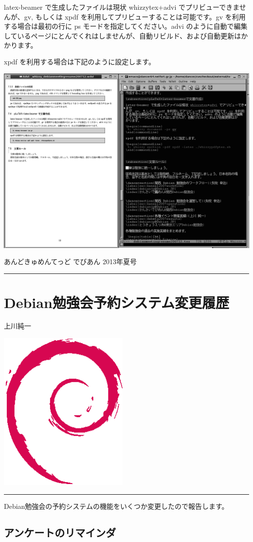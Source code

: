 \documentclass[mingoth,a4paper]{jsarticle}
\renewcommand{\dancersection}[2]{%
\newpage
あんどきゅめんてっど でびあん 2013年夏号
%
\vspace{0.1mm}\\
{\color{dancerdarkblue}\rule{\hsize}{2mm}}

%
%
\begin{minipage}[t]{0.6\hsize}
\color{dancerdarkblue}
\vspace{1cm}
\section{#1}
\hfill{}#2\\
\end{minipage}
\begin{minipage}[t]{0.4\hsize}
\vspace{-2cm}
\hfill{}\includegraphics[height=8cm]{image200502/openlogo-nd.eps}\\
\vspace{-5cm}
\end{minipage}
%
{\color{dancerlightblue}\rule{0.66\hsize}{2mm}}
%
\vspace{2cm}
}
\begin{document}
latex-beamer で生成したファイルは現状 whizzytex+advi でプリビューできませ
んが、gv, もしくは xpdf を利用してプリビューすることは可能です。gv を利用
する場合は最初の行に ps モードを指定してください。advi のように自動で編集
しているページにとんでくれはしませんが、自動リビルド、および自動更新はか
かります。

\begin{commandline}
\end{commandline}

xpdf を利用する場合は下記のように設定します。

\begin{commandline}
\end{commandline}

\includegraphics[width=1\hsize]{image200712/whizzytex_mono.png}

\dancersection{Debian勉強会予約システム変更履歴}{上川純一}

Debian勉強会の予約システムの機能をいくつか変更したので報告します。

\subsection{アンケートのリマインダ}
\end{document}
